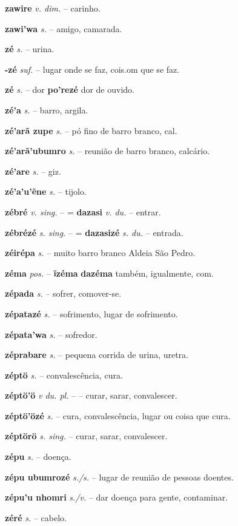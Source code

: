 \textbf{zawire} \textit{v. dim.} -- carinho.

\textbf{zawi'wa} \textit{s.} -- amigo, camarada.

\textbf{zé} \textit{s.} -- urina.

\textbf{-zé} \textit{suf.} -- lugar onde se faz, cois.om que se faz.

\textbf{zé} \textit{s.} -- dor  \textbf{po'rezé} dor de ouvido.

\textbf{zé'a} \textit{s.} -- barro, argila.

\textbf{zé'arã zupe} \textit{s.} -- pó fino de barro branco, cal.

\textbf{zé'arã'ubumro} \textit{s.} -- reunião de barro branco, calcário.

\textbf{zé'are} \textit{s.} -- giz.

\textbf{zé'a'u'ẽne} \textit{s.} -- tijolo.

\textbf{zébré} \textit{v. sing.} -- = \textbf{dazasi} \textit{v. du.} -- entrar.

\textbf{zébrézé} \textit{s. sing.} -- = \textbf{dazasizé} \textit{s. du.} -- entrada.

\textbf{zéirépa} \textit{s.} -- muito barro branco  Aldeia São Pedro.

\textbf{zéma} \textit{pos.} -- \textbf{ĩzéma} \textbf{dazéma} também, igualmente, com.

\textbf{zépada} \textit{s.} -- sofrer, comover-se.

\textbf{zépatazé} \textit{s.} -- sofrimento, lugar de sofrimento.

\textbf{zépata'wa} \textit{s.} -- sofredor.

\textbf{zéprabare} \textit{s.} -- pequena corrida de urina, uretra.

\textbf{zéptö} \textit{s.} -- convalescência, cura.

\textbf{zéptö'ö} \textit{v du. pl.} -- -- curar, sarar, convalescer.

\textbf{zéptö'özé} \textit{s.} -- cura, convalescência, lugar ou coisa que cura.

\textbf{zéptörö} \textit{s. sing.} -- curar, sarar, convalescer.

\textbf{zépu} \textit{s.} -- doença.

\textbf{zépu ubumrozé} \textit{s./s.} -- lugar de reunião de pessoas doentes.

\textbf{zépu'u nhomri} \textit{s./v.} -- dar doença para gente, contaminar.

\textbf{zéré} \textit{s.} -- cabelo.

